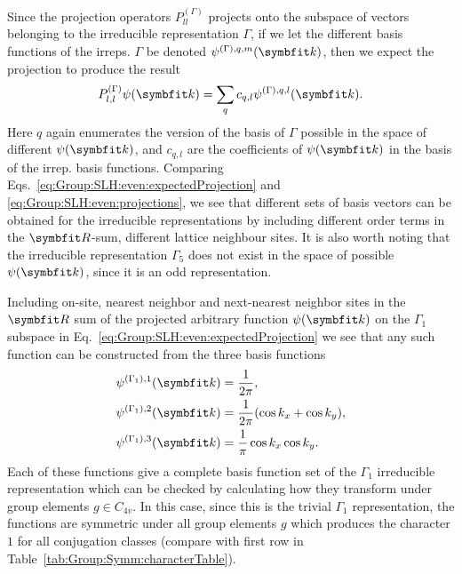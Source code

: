 %
Since the projection operators $P_{ll}^{(\Gamma)}$ projects onto the subspace of vectors belonging to the irreducible representation $\Gamma$, if we
let the different basis functions of the irreps. $\Gamma$ be denoted $\psi^{(\Gamma),q,m}(\v{k})$, then we expect the projection to produce the result
\begin{equation}
    \label{eq:Group:SLH:even:expectedProjection}
    P_{l,l}^{(\Gamma)}\psi(\v{k}) = \sum_{q}c_{q,l}\psi^{(\Gamma),q,l}(\v{k}).
\end{equation}
Here $q$ again enumerates the version of the basis of $\Gamma$ possible in the space of different $\psi(\v{k})$, and $c_{q,l}$ are the coefficients of
$\psi(\v{k})$ in the basis of the irrep. basis functions. Comparing Eqs.~\eqref{eq:Group:SLH:even:expectedProjection} and \eqref{eq:Group:SLH:even:projections},
we see that different sets of basis vectors can be obtained for the irreducible representations by including different order terms in the $\v{R}$-sum,
\ie different lattice neighbour sites. It is also worth noting that the irreducible representation $\Gamma_5$ does not exist in the space of possible $\psi(\v{k})$,
since it is an odd representation.

Including on-site, nearest neighbor and next-nearest neighbor sites in the $\v{R}$ sum of the projected arbitrary function $\psi(\v{k})$ on the $\Gamma_1$ subspace in
Eq.~\eqref{eq:Group:SLH:even:expectedProjection} we see that any such function can be constructed from the three basis functions
\begin{subequations}
    \label{eq:Group:SLH:even:G1basis}
    \begin{align}
        \label{eq:Group:SLH:even:G1basis:1}
        \psi^{(\Gamma_1),1}(\v{k}) &= \frac{1}{2\pi},\\
        \label{eq:Group:SLH:even:G1basis:2}
        \psi^{(\Gamma_1),2}(\v{k}) &= \frac{1}{2\pi}(\cos k_x + \cos k_y),\\
        \label{eq:Group:SLH:even:G1basis:3}
        \psi^{(\Gamma_1),3}(\v{k}) &= \frac{1}{\pi}\cos k_x \cos k_y.
    \end{align}
\end{subequations}
Each of these functions give a complete basis function set of the $\Gamma_1$ irreducible representation which can be checked by calculating how they transform under
group elements $g\in C_{4v}$. In this case, since this is the trivial $\Gamma_1$ representation, the functions are symmetric under all group elements $g$ which
produces the character $1$ for all conjugation classes (compare with first row in Table~\ref{tab:Group:Symm:characterTable}). 

